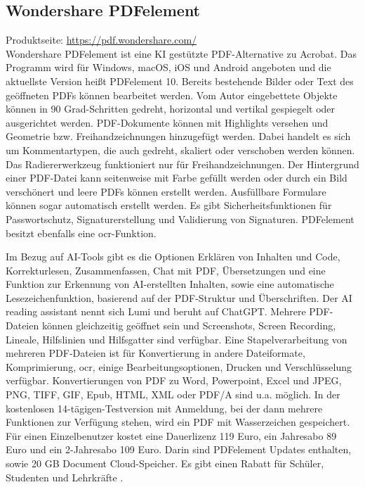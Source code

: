\subsection{Wondershare PDFelement}
Produktseite: \url{https://pdf.wondershare.com/} \\
Wondershare PDFelement ist eine KI gestützte PDF-Alternative zu Acrobat. Das Programm wird für Windows, macOS, iOS und Android angeboten und die aktuellste Version heißt PDFelement 10. Bereits bestehende Bilder oder Text des geöffneten PDFs können bearbeitet werden. Vom Autor eingebettete Objekte können in 90 Grad-Schritten gedreht, horizontal und vertikal gespiegelt oder ausgerichtet werden. PDF-Dokumente können mit Highlights versehen und Geometrie bzw. Freihandzeichnungen hinzugefügt werden. Dabei handelt es sich um Kommentartypen, die auch gedreht, skaliert oder verschoben werden können. Das Radiererwerkzeug funktioniert nur für Freihandzeichnungen. Der Hintergrund einer PDF-Datei kann seitenweise mit Farbe gefüllt werden oder durch ein Bild verschönert und leere PDFs können erstellt werden. Ausfüllbare Formulare können sogar automatisch erstellt werden. Es gibt Sicherheitsfunktionen für Passwortschutz, Signaturerstellung und Validierung von Signaturen. PDFelement besitzt ebenfalls eine \gls{ocr}-Funktion. 
\par
Im Bezug auf AI-Tools gibt es die Optionen Erklären von Inhalten und Code, Korrekturlesen, Zusammenfassen, Chat mit PDF, Übersetzungen und eine Funktion zur Erkennung von AI-erstellten Inhalten, sowie eine automatische Lesezeichenfunktion, basierend auf der PDF-Struktur und Überschriften. Der AI reading assistant nennt sich Lumi und beruht auf ChatGPT. Mehrere PDF-Dateien können gleichzeitig geöffnet sein und Screenshots, Screen Recording, Lineale, Hilfslinien und Hilfsgatter sind verfügbar. Eine Stapelverarbeitung von mehreren PDF-Dateien ist für Konvertierung in andere Dateiformate, Komprimierung, \gls{ocr}, einige Bearbeitungsoptionen, Drucken und Verschlüsselung verfügbar. Konvertierungen von PDF zu Word, Powerpoint, Excel und JPEG, PNG, TIFF, GIF, Epub, HTML, XML oder PDF/A sind u.a. möglich. In der kostenlosen 14-tägigen-Testversion mit Anmeldung, bei der dann mehrere Funktionen zur Verfügung stehen, wird ein PDF mit Wasserzeichen gespeichert. Für einen Einzelbenutzer kostet eine Dauerlizenz 119 Euro, ein Jahresabo 89 Euro und ein 2-Jahresabo 109 Euro. Darin sind PDFelement Updates enthalten, sowie 20 GB Document Cloud-Speicher. Es gibt einen Rabatt für Schüler, Studenten und Lehrkräfte \cite{wondershare-um}.  

